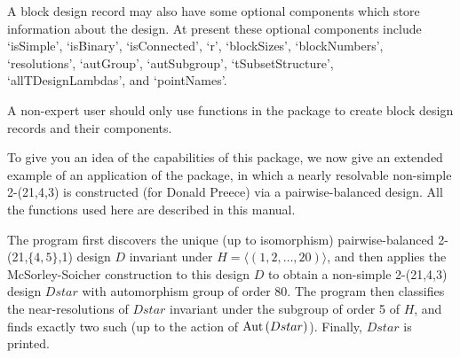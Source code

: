 A block design record may also have some optional components which store
information about the design. At present these optional components include
`isSimple', `isBinary', `isConnected', `r', `blockSizes', `blockNumbers',
`resolutions', `autGroup', `autSubgroup', `tSubsetStructure',
`allTDesignLambdas', and `pointNames'.

A non-expert user should only use functions in the {\DESIGN} package to
create block design records and their components.


To give you an idea of the capabilities of this package, we now give an
extended example of an application of the {\DESIGN} package, in which
a nearly resolvable non-simple 2-(21,4,3) is constructed (for Donald
Preece) via a pairwise-balanced design. All the {\DESIGN} functions used
here are described in this manual.

The program first discovers the unique (up to isomorphism)
pairwise-balanced 2-(21,$\{4,5\}$,1) design $D$ invariant under
$H=\langle (1,2,\ldots,20)\rangle$, and then applies the McSorley-Soicher
construction to this design $D$ to obtain a non-simple 2-(21,4,3) design
$Dstar$ with automorphism group of order 80. The program then classifies
the near-resolutions of $Dstar$ invariant under the subgroup of order 5
of $H$, and finds exactly two such (up to the action of ${\rm Aut}\,(Dstar)$).
Finally, $Dstar$ is printed.

